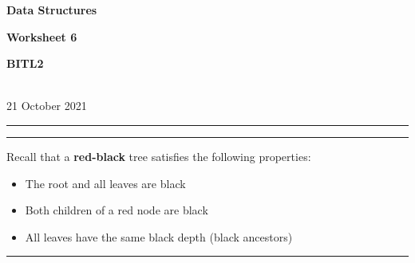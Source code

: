 \documentclass[a4paper,12pt]{article}
\begin{document}
\begin{center}
\parbox{3.5cm}{\textbf{Data Structures}} \hfill {\bf\Huge Worksheet 6} \hfill \parbox{3.5cm}{\flushright\textbf{BITL2}} \\[5pt]
\rm\small 21 October 2021
\end{center}

\hrule\vspace{2pt}\hrule

\vspace{10pt}
\noindent
Recall that a \textbf{red-black} tree satisfies the following properties:
\begin{itemize}
\item The root and all leaves are black
\item Both children of a red node are black
\item All leaves have the same black depth (black ancestors)
\end{itemize}
\hrule
\end{document}
